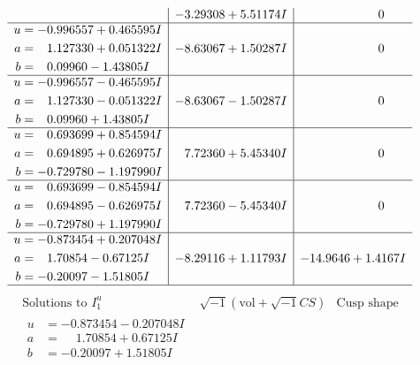 \documentclass[1p]{elsarticle_modified}
\theoremstyle{definition}
\newcommand{\I}{\sqrt{-1}}
\begin{document}
$$\begin{array}{c|c|c}
 & -3.29308 + 5.51174 I & \phantom{-0.000000 } 0 \\ \hline\begin{aligned}
u &= -0.996557 + 0.465595 I \\
a &= \phantom{-}1.127330 + 0.051322 I \\
b &= \phantom{-}0.09960 - 1.43805 I\end{aligned}
 & -8.63067 + 1.50287 I & \phantom{-0.000000 } 0 \\ \hline\begin{aligned}
u &= -0.996557 - 0.465595 I \\
a &= \phantom{-}1.127330 - 0.051322 I \\
b &= \phantom{-}0.09960 + 1.43805 I\end{aligned}
 & -8.63067 - 1.50287 I & \phantom{-0.000000 } 0 \\ \hline\begin{aligned}
u &= \phantom{-}0.693699 + 0.854594 I \\
a &= \phantom{-}0.694895 + 0.626975 I \\
b &= -0.729780 - 1.197990 I\end{aligned}
 & \phantom{-}7.72360 + 5.45340 I & \phantom{-0.000000 } 0 \\ \hline\begin{aligned}
u &= \phantom{-}0.693699 - 0.854594 I \\
a &= \phantom{-}0.694895 - 0.626975 I \\
b &= -0.729780 + 1.197990 I\end{aligned}
 & \phantom{-}7.72360 - 5.45340 I & \phantom{-0.000000 } 0 \\ \hline\begin{aligned}
u &= -0.873454 + 0.207048 I \\
a &= \phantom{-}1.70854 - 0.67125 I \\
b &= -0.20097 - 1.51805 I\end{aligned}
 & -8.29116 + 1.11793 I & -14.9646 + 1.4167 I\\
 \hline 
 \end{array}$$\newpage$$\begin{array}{c|c|c}  
\text{Solutions to }I^u_{1}& \I (\text{vol} + \sqrt{-1}CS) & \text{Cusp shape}\\
 \hline 
\begin{aligned}
u &= -0.873454 - 0.207048 I \\
a &= \phantom{-}1.70854 + 0.67125 I \\
b &= -0.20097 + 1.51805 I\end{aligned}

\end{array}$$
\end{document}
